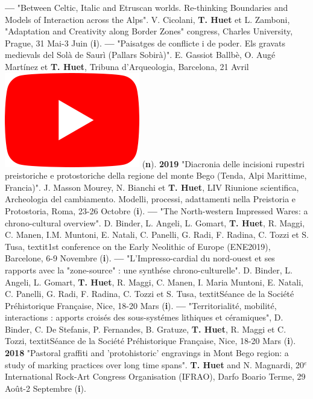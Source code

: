 \documentclass{article}
\begin{document}
\smallbreak
\textbf{--- }"Between Celtic, Italic and Etruscan worlds. Re-thinking Boundaries and Models of Interaction across the Alps". V. Cicolani, \textbf{T. Huet} et L. Zamboni, "Adaptation and Creativity along Border Zones" congress, Charles University, Prague, 31 Mai-3 Juin (\textbf{i}).
\smallbreak
\textbf{--- }"Paisatges de conflicte i de poder. Els gravats medievals del Sol\`{a} de Saur\`{i} (Pallars Sobir\`{a})". E. Gassiot Ballb\`{e}, O. Aug\'{e} Mart\'{i}nez et \textbf{T. Huet}, Tribuna d'Arqueologia, Barcelona, 21 Avril \href{https://www.youtube.com/watch?v=4b7gLw4NV_E}{\includegraphics[scale=0.2]{icon_youtube}} (\textbf{n}).
\smallbreak
\textbf{2019 }"Diacronia delle incisioni rupestri preistoriche e protostoriche della regione del monte Bego (Tenda, Alpi Marittime, Francia)". J. Masson Mourey, N. Bianchi et \textbf{T. Huet}, LIV Riunione scientifica, Archeologia del cambiamento. Modelli, processi, adattamenti nella Preistoria e Protostoria, Roma, 23-26 Octobre (\textbf{i}).
\smallbreak
\textbf{--- }"The North-western Impressed Wares: a chrono-cultural overview". D. Binder, L. Angeli, L. Gomart, \textbf{T. Huet}, R. Maggi, C. Manen, I.M. Muntoni, E. Natali, C. Panelli, G. Radi, F. Radina, C. Tozzi et S. Tusa, textit{1st conference on the Early Neolithic of Europe (ENE2019)}, Barcelone, 6-9 Novembre (\textbf{i}).
\smallbreak
\textbf{--- }"L'Impresso-cardial du nord-ouest et ses rapports avec la "zone-source" : une synth\'{e}se chrono-culturelle". D. Binder, L. Angeli, L. Gomart, \textbf{T. Huet}, R. Maggi, C. Manen, I. Maria Muntoni, E. Natali, C. Panelli, G. Radi, F. Radina, C. Tozzi et S. Tusa, textit{S\'{e}ance de la Soci\'{e}t\'{e} Pr\'{e}historique Fran\c{c}aise}, Nice, 18-20 Mars (\textbf{i}).
\smallbreak
\textbf{--- }"Territorialit\'{e}, mobilit\'{e}, interactions : apports crois\'{e}s des sous-syst\'{e}mes lithiques et c\'{e}ramiques", D. Binder, C. De Stefanis, P. Fernandes, B. Gratuze, \textbf{T. Huet}, R. Maggi et C. Tozzi, textit{S\'{e}ance de la Soci\'{e}t\'{e} Pr\'{e}historique Fran\c{c}aise}, Nice, 18-20 Mars (\textbf{i}).
\smallbreak
\textbf{2018 }"Pastoral graffiti and 'protohistoric' engravings in Mont Bego region: a study of marking practices over long time spans". \textbf{T. Huet} and N. Magnardi, 20${}^{e}$ International Rock-Art Congress Organisation (IFRAO), Darfo Boario Terme, 29 Août-2 Septembre (\textbf{i}).
\end{document}
